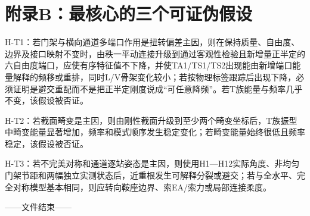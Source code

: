 \documentclass[UTF8,a4paper,11pt,fontset=none]{ctexart}
\begin{document}
\section*{附录B：最核心的三个可证伪假设}
H-T1：若门架与横向通道多端口作用是扭转偏差主因，则在保持质量、自由度、边界及接口映射不变时，由秩一平动连接升级到通过客观性检验且新增量正半定的六自由度端口，应使有序特征值不下降，并使TA1/TS1/TS2出现能由新增端口能量解释的频移或重排，同时L/V骨架变化较小；若按物理标签跟踪后出现下降，必须证明是避交重配而不是把正半定刚度说成“可任意降频”。若T族能量与频率几乎不变，该假设被否证。\par
H-T2：若截面畸变是主因，则由刚性截面升级到至少两个畸变坐标后，T族振型中畸变能量显著增加，频率和模式顺序发生稳定变化；若畸变能量始终很低且频率稳定，该假设被否证。\par
H-T3：若不完美对称和通道逐站姿态是主因，则使用H1—H12实际角度、非均匀门架节距和两幅独立实测状态后，近重根发生可解释分裂或避交；若与全水平、完全对称模型基本相同，则应转向鞍座边界、索EA/索力或局部连接柔度。\par
——文件结束——\par
\end{document}
